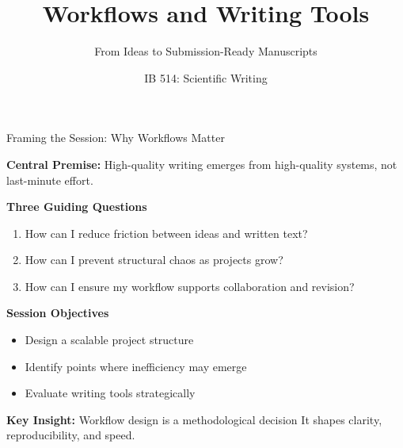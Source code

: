 \documentclass{beamer}
\title{Workflows and Writing Tools}
\subtitle{From Ideas to Submission-Ready Manuscripts}
\author[]{IB 514: Scientific Writing}
\date[]{}
\begin{document}

\begin{frame}
  \titlepage
\end{frame}



\begin{frame}{Framing the Session: Why Workflows Matter}

\small

\textbf{Central Premise:}
    High-quality writing emerges from high-quality systems, not last-minute effort.


\vspace{0.5em}

\textbf{Three Guiding Questions}
\begin{enumerate}
    \item How can I reduce friction between ideas and written text?
    \item How can I prevent structural chaos as projects grow?
    \item How can I ensure my workflow supports collaboration and revision?
\end{enumerate}

\vspace{0.5em}

\textbf{Session Objectives}
\begin{itemize}
    \item Design a scalable project structure
    \item Identify points where inefficiency may emerge
    \item Evaluate writing tools strategically
\end{itemize}

\vspace{0.5em}

\begin{block}{\textbf{Key Insight:} Workflow design is a methodological decision }
    It shapes clarity, reproducibility, and speed.
\end{block}

\end{frame}

\end{document}
